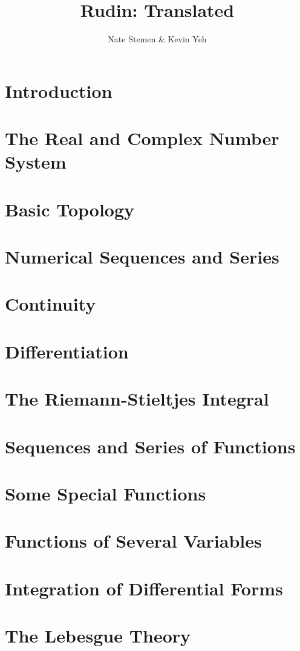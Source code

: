 \documentclass{tufte-book}
\title{Rudin: Translated}
\author{Nate Stemen \& Kevin Yeh}
\begin{document}
\chapter{Introduction}


\chapter{The Real and Complex Number System}


\chapter{Basic Topology}


\chapter{Numerical Sequences and Series}


\chapter{Continuity}


\chapter{Differentiation}



\chapter{The Riemann-Stieltjes Integral}



\chapter{Sequences and Series of Functions}



\chapter{Some Special Functions}



\chapter{Functions of Several Variables}



\chapter{Integration of Differential Forms}



\chapter{The Lebesgue Theory}

\end{document}
